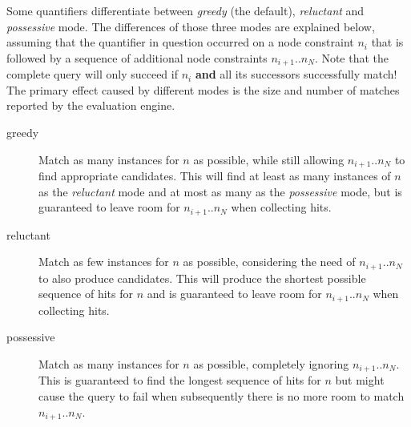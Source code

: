 \documentclass[11pt,a4paper]{report}
\begin{document}
Some quantifiers differentiate between \textit{greedy} (the default), \textit{reluctant} and \textit{possessive} mode.
The differences of those three modes are explained below, assuming that the quantifier in question occurred on a node constraint $n_i$ that is followed by a sequence of additional node constraints $n_{i+1}..n_N$.
Note that the complete query will only succeed if $n_i$ \textbf{and} all its successors successfully match!
The primary effect caused by different modes is the size and number of matches reported by the evaluation engine.
\begin{description}
	\item[greedy] Match as many instances for $n$ as possible, while still allowing $n_{i+1}..n_N$ to find appropriate candidates. This will find at least as many instances of $n$ as the \textit{reluctant} mode and at most as many as the \textit{possessive} mode, but is guaranteed to leave room for $n_{i+1}..n_N$ when collecting hits.
	\item[reluctant] Match as few instances for $n$ as possible, considering the need of $n_{i+1}..n_N$ to also produce candidates. This will produce the shortest possible sequence of hits for $n$ and is guaranteed to leave room for $n_{i+1}..n_N$ when collecting hits.
	\item[possessive] Match as many instances for $n$ as possible, completely ignoring $n_{i+1}..n_N$. This is guaranteed to find the longest sequence of hits for $n$ but might cause the query to fail when subsequently there is no more room to match $n_{i+1}..n_N$.
\end{description}
\end{document}
